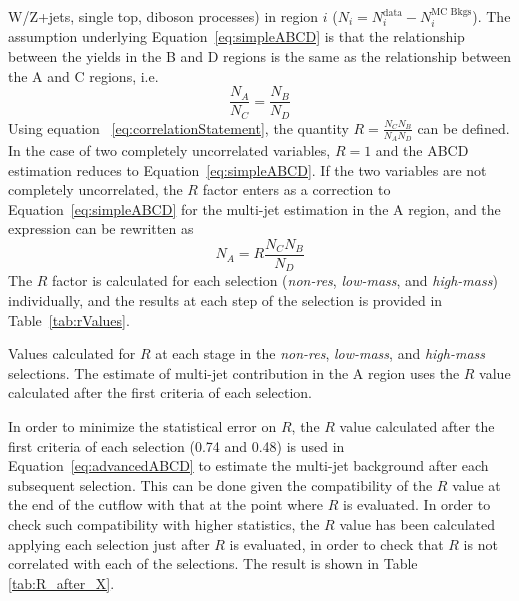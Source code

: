 W/Z+jets, single top, diboson processes) in region $i$ ($N_i = N_i^{\text{data}} - N_i^{\text{MC Bkgs}}$). 
The assumption underlying Equation~\ref{eq:simpleABCD} is that the relationship between the 
yields in the B and D regions is the same as the relationship between the A and C regions, i.e.
\begin{equation}
\frac{N_{A}}{N_{C}} = \frac{N_B}{N_D}
\label{eq:correlationStatement}
\end{equation}
Using equation ~\ref{eq:correlationStatement}, the quantity $R= \frac{N_{C} N_B}{N_{A} N_D}$ can be 
defined. In the case of two completely uncorrelated variables, $R=1$ and the ABCD estimation reduces 
to Equation~\ref{eq:simpleABCD}. If the two variables are not completely uncorrelated, the $R$ 
factor enters as a correction to Equation~\ref{eq:simpleABCD} for the multi-jet estimation in the A 
region, and the expression can be rewritten as
\begin{equation}
N_{A} = R \frac{N_C N_B}{N_D}
\label{eq:advancedABCD}
\end{equation}
The $R$ factor is calculated for each selection (\emph{non-res}, \emph{low-mass}, and \emph{high-mass}) individually,
and the results at each step of the selection is provided in
Table~\ref{tab:rValues}.


\begin{table}[h!]
\centering

\caption[Values of R at each selection]{Values calculated for $R$ at each stage in the \emph{non-res},
  \emph{low-mass}, and \emph{high-mass} selections. The estimate of multi-jet
  contribution in the A region uses the $R$ value calculated after the
  first criteria of each selection.} \label{tab:rValues}
\end{table}
In order to minimize the statistical error on $R$, the $R$ value calculated after 
the first criteria of each selection (0.74 and 0.48) is used in Equation~\ref{eq:advancedABCD} to estimate the multi-jet
background after each subsequent selection. This can be done given the
compatibility of the $R$ value at the end of the cutflow with that at
the point where $R$ is evaluated. In order to check such compatibility
with higher statistics, the $R$ value has been calculated applying
each selection just after $R$ is evaluated, in order
to check that $R$ is not correlated with each of the selections.
The result is shown in Table \ref{tab:R_after_X}.


